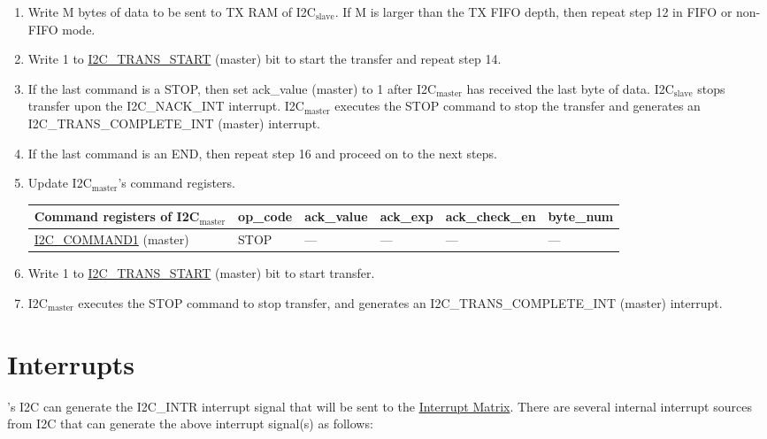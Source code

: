 \documentclass[main\_\_EN.tex]{subfiles}
\begin{document}
\begin{enumerate}
\item Write M bytes of data to be sent to TX RAM of I2C$_\text{slave}$. If M is larger than the TX FIFO depth, then repeat step 12 in FIFO or non-FIFO mode.
\item Write 1 to \hyperref[fielddesc:I2CTRANSSTART]{I2C\_TRANS\_START} (master) bit to start the transfer and repeat step 14.
\item If the last command is a STOP, then set ack\_value (master) to 1 after I2C$_\text{master}$ has received the last byte of data. I2C$_\text{slave}$ stops transfer upon the I2C\_NACK\_INT interrupt. I2C$_\text{master}$ executes the STOP command to stop the transfer and generates an I2C\_TRANS\_COMPLETE\_INT (master) interrupt.
\item If the last command is an END, then repeat step 16 and proceed on to the next steps.
\item Update I2C$_\text{master}$'s command registers.
\begin{longtable}{ | p{4cm} | p{2cm} | p{2cm} | p{2cm} |p{2cm} | p{2cm} |}
\hline\rowcolor{lightgray}
Command registers of I2C$_\text{master}$& op\_code & ack\_value&ack\_exp&ack\_check\_en&byte\_num  \\ \hline
\hyperref[fielddesc:I2CCOMMAND1]{I2C\_COMMAND1} (master)& STOP& ---&---&---&---  \\ \hline
\end{longtable}
\item Write 1 to \hyperref[fielddesc:I2CTRANSSTART]{I2C\_TRANS\_START} (master) bit to start transfer.
\item I2C$_\text{master}$ executes the STOP command to stop transfer, and generates an I2C\_TRANS\_COMPLETE\_INT (master) interrupt.

\end{enumerate}

\section{Interrupts}
\label{sub:i2c-int}

\chipname{}'s I2C can generate the I2C\_INTR interrupt signal that will be sent to the \hyperref[mod:intmtrx]{Interrupt Matrix}. There are several internal interrupt sources from I2C that can generate the above interrupt signal(s) as follows:
\end{document}
